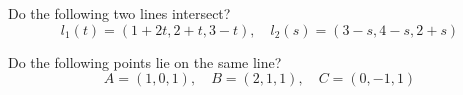 \documentclass[openany]{book}
\begin{document}
\begin{prob}
    Do the following two lines intersect?
    \begin{equation*}
        l_1(t)=(1+2t, 2+t, 3-t), \quad l_2(s)=(3-s, 4-s, 2+s)
    \end{equation*}
\end{prob}

\newpage
\begin{prob}
    Do the following points lie on the same line?
    \begin{equation*}
        A=(1,0,1),\quad B=(2,1,1), \quad C=(0,-1,1)
    \end{equation*}
\end{prob}
\newpage
\end{document}
